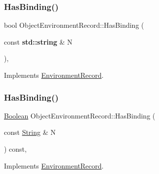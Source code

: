 \subsubsection{\texorpdfstring{Has\+Binding()}{HasBinding()}\hspace{0.1cm}{\footnotesize\ttfamily [1/2]}}
{\footnotesize\ttfamily bool Object\+Environment\+Record\+::\+Has\+Binding (\begin{DoxyParamCaption}\item[{const \textbf{ std\+::string} \&}]{N }\end{DoxyParamCaption})\hspace{0.3cm}{\ttfamily [final]}, {\ttfamily [virtual]}}



Implements \hyperlink{struct_environment_record_aa9e241cd34f23e84ecaa19cf35657e9e}{Environment\+Record}.

\mbox{\label{struct_object_environment_record_a88d20bcdf70ed4b5f5a837b99e26a963}} 
\subsubsection{\texorpdfstring{Has\+Binding()}{HasBinding()}\hspace{0.1cm}{\footnotesize\ttfamily [2/2]}}
{\footnotesize\ttfamily \hyperlink{struct_boolean}{Boolean} Object\+Environment\+Record\+::\+Has\+Binding (\begin{DoxyParamCaption}\item[{const \hyperlink{struct_string}{String} \&}]{N }\end{DoxyParamCaption}) const\hspace{0.3cm}{\ttfamily [final]}, {\ttfamily [virtual]}}



Implements \hyperlink{struct_environment_record_a4e9bc2438be3466fd0d9607cdbd20225}{Environment\+Record}.

\mbox{\label{struct_object_environment_record_a8b10ec38bc18347950dffdfb4d34a634}} 

